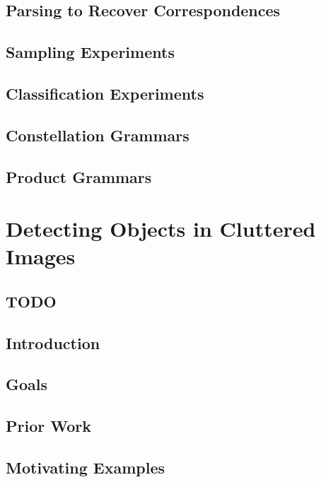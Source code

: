 \documentclass{tufte-book}
\begin{document}
  \section{Parsing to Recover Correspondences}
    

  \section{Sampling Experiments}
  \section{Classification Experiments}
  \section{Constellation Grammars}
  \section{Product Grammars}

\chapter{Detecting Objects in Cluttered Images}

  \section{TODO}
      

  \section{Introduction}
    

  \section{Goals}
    

  \section{Prior Work}

  \section{Motivating Examples}
%    
\end{document}
